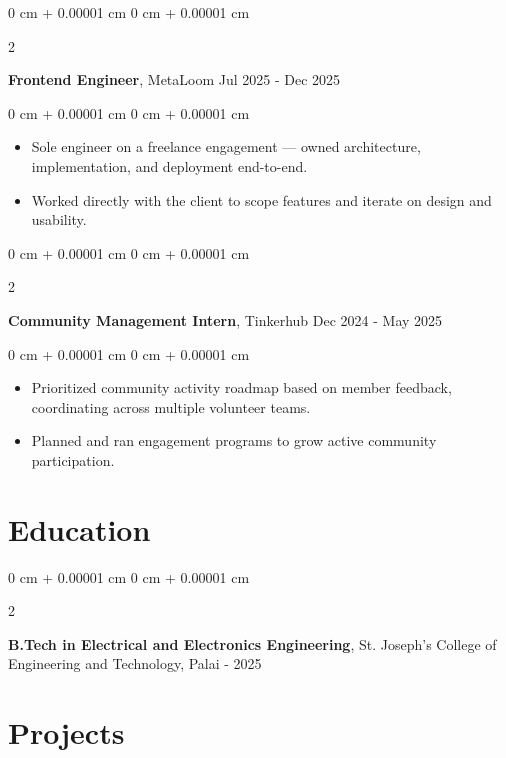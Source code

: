 \documentclass[10pt, letterpaper]{article}
\newenvironment{highlights}{
    \begin{itemize}[
        topsep=0.10 cm,
        parsep=0.10 cm,
        partopsep=0pt,
        itemsep=0pt,
        leftmargin=0 cm + 10pt
    ]
}{
    \end{itemize}
} %
\newenvironment{onecolentry}{
    \begin{adjustwidth}{
        0 cm + 0.00001 cm
    }{
        0 cm + 0.00001 cm
    }
}{
    \end{adjustwidth}
} %
\newenvironment{twocolentry}[2][]{
    \onecolentry
    \def\secondColumn{#2}
    \setcolumnwidth{\fill, 4.5 cm}
    \begin{paracol}{2}
}{
    \switchcolumn \raggedleft \secondColumn
    \end{paracol}
    \endonecolentry
} %
\begin{document}
        \vspace{0.2 cm}

         \begin{twocolentry}{
            Jul 2025 - Dec 2025
        }
            \textbf{Frontend Engineer}, MetaLoom\end{twocolentry}

        \vspace{0.10 cm}
        \begin{onecolentry}
            \begin{highlights}
                \item Sole engineer on a freelance engagement — owned architecture, implementation, and deployment end-to-end.
                \item Worked directly with the client to scope features and iterate on design and usability.
            \end{highlights}
        \end{onecolentry}
    \begin{twocolentry}{
            Dec 2024 - May 2025
        }
            \textbf{Community Management Intern}, Tinkerhub\end{twocolentry}

        \vspace{0.10 cm}
        \begin{onecolentry}
            \begin{highlights}
                \item Prioritized community activity roadmap based on member feedback, coordinating across multiple volunteer teams.
                \item Planned and ran engagement programs to grow active community participation.
            \end{highlights}
        \end{onecolentry}

        \vspace{0.2 cm}

    \section{Education}
        \begin{twocolentry}{
            2021 - 2025
        }
            \textbf{B.Tech in Electrical and Electronics Engineering}, St. Joseph's College of Engineering and Technology, Palai\end{twocolentry}

    \section{Projects}
\end{document}
